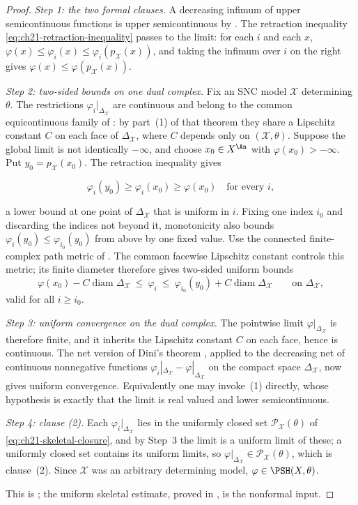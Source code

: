 \begin{proof}
\emph{Step 1: the two formal clauses.}
A decreasing infimum of upper semicontinuous functions is upper
semicontinuous by .  The retraction inequality
\eqref{eq:ch21-retraction-inequality} passes to the
limit: for each $i$ and each $x$, $\varphi(x)\leq\varphi_i(x)\leq
\varphi_i(p_{\mathcal X}(x))$, and taking the infimum over $i$ on the
right gives $\varphi(x)\leq\varphi(p_{\mathcal X}(x))$.

\emph{Step 2: two-sided bounds on one dual complex.}
Fix an SNC model $\mathcal X$ determining $\theta$.  The restrictions
$\varphi_i|_{\Delta_{\mathcal X}}$ are continuous and belong to the
common equicontinuous family of : by
part~(1) of that theorem they share a Lipschitz constant $C$ on each face
of $\Delta_{\mathcal X}$, where $C$ depends only on
$(\mathcal X,\theta)$.  Suppose
the global limit is not identically $-\infty$, and choose
$x_0\in X^{\An}$ with $\varphi(x_0)>-\infty$.  Put
$y_0=p_{\mathcal X}(x_0)$.  The retraction inequality gives

\[
        \varphi_i(y_0)\geq\varphi_i(x_0)\geq\varphi(x_0)
        \quad\text{for every }i,
\]

a lower bound at one point of $\Delta_{\mathcal X}$ that is uniform in
$i$.  Fixing one index $i_0$ and discarding the indices not beyond it,
monotonicity also bounds
$\varphi_i(y_0)\leq\varphi_{i_0}(y_0)$ from above by one fixed value.
Use the connected finite-complex path metric of
.  The common facewise Lipschitz constant
controls this metric; its finite diameter therefore gives two-sided
uniform bounds
\[
 \varphi(x_0)-C\operatorname{diam}\Delta_{\mathcal X}
 \ \leq\ \varphi_i\ \leq\
 \varphi_{i_0}(y_0)+C\operatorname{diam}\Delta_{\mathcal X}
 \qquad\text{on }\Delta_{\mathcal X},
\]
valid for all $i\geq i_0$.

\emph{Step 3: uniform convergence on the dual complex.}
The pointwise limit $\varphi|_{\Delta_{\mathcal X}}$ is therefore finite,
and it inherits the Lipschitz constant $C$ on each face, hence is
continuous.  The net version of Dini's theorem
, applied to the decreasing net of continuous
nonnegative functions
$\varphi_i|_{\Delta_{\mathcal X}}-
\varphi|_{\Delta_{\mathcal X}}$ on the compact space
$\Delta_{\mathcal X}$, now gives uniform convergence.  Equivalently one
may invoke \Cref{prop:dini-usc}\,(1) directly, whose hypothesis is exactly
that the limit is real valued and lower semicontinuous.

\emph{Step 4: clause \textup{(2)}.}
Each $\varphi_i|_{\Delta_{\mathcal X}}$ lies in the uniformly closed set
$\mathcal P_{\mathcal X}(\theta)$ of \eqref{eq:ch21-skeletal-closure}, and
by Step~3 the limit is a uniform limit of these; a uniformly closed set
contains its uniform limits, so
$\varphi|_{\Delta_{\mathcal X}}\in\mathcal P_{\mathcal X}(\theta)$, which
is clause~(2).  Since $\mathcal X$ was an arbitrary determining model,
$\varphi\in\PSH(X,\theta)$.

This is \cite[Corollary~7.9]{BFJ16}; the uniform
skeletal estimate, proved in , is the
nonformal input.
\end{proof}

